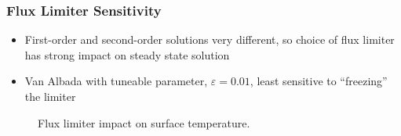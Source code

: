 \documentclass{beamer}
\begin{document}
\begin{frame}
  \frametitle{Flux Limiter Sensitivity}
  \begin{itemize}
    \item First-order and second-order solutions very different, so
      choice of flux limiter has strong impact on steady state solution
    \item Van Albada with tuneable parameter, $\varepsilon = 0.01$, least
      sensitive to ``freezing'' the limiter
  \end{itemize}
  \vspace{-0.5cm}
\begin{figure}[h]
  \centering
  \caption{Flux limiter impact on surface temperature.}
  \label{fig:vl-va-impact}
\end{figure}
\end{frame}
\end{document}
